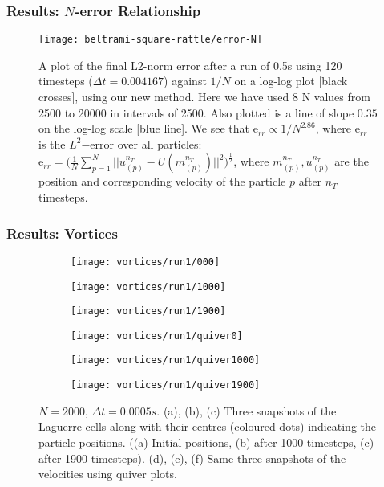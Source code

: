 \documentclass[10pt]{beamer}
\newcommand{\dt}{\Delta t}
\begin{document}
\frame
{
  \frametitle{Results: \(N\)-error Relationship}

\begin{figure}[H]
\texttt{[image: beltrami-square-rattle/error-N]}
\centering
\caption{A plot of the final L2-norm error after a run of 0.5s using 120 timesteps (\(\dt = 0.004167\)) against \(1/N\) on a log-log plot [black crosses], using our new method. Here we have used 8 N values from 2500 to 20000 in intervals of 2500. Also plotted is a line of slope \(0.35\) on the log-log scale [blue line]. 
We see that \(\text{e}_{rr} \propto 1/N^{2.86}\), where \(\text{e}_{rr}\) is the \(L^2\mathrm{-error}\) over all particles: \(\text{e}_{rr} = \Big( \frac{1}{N} \sum_{p = 1}^{N} || u^{n_T}_{(p)} - U(m^{n_T}_{(p)}) ||^2 \Big) ^\frac{1}{2}\), where \(m^{n_T}_{(p)}, u^{n_T}_{(p)}\) are the position and corresponding velocity of the particle \(p\) after \(n_T\) timesteps.}
\centering
\label{fig:error-N}
\end{figure}

}

\frame
{
  \frametitle{Results: Vortices}

\begin{figure}[H]
   \begin{subfigure}[t]{0.25\textwidth}
        \centering
        \texttt{[image: vortices/run1/000]}
        \caption{} \label{fig:vortices-000}
    \end{subfigure}
   \begin{subfigure}[t]{0.25\textwidth}
        \centering
	\texttt{[image: vortices/run1/1000]}
        \caption{} \label{fig:vortices-1000}
    \end{subfigure}
   \begin{subfigure}[t]{0.25\textwidth}
        \centering
	\texttt{[image: vortices/run1/1900]}
        \caption{} \label{fig:vortices-1900}
    \end{subfigure}
   \begin{subfigure}[t]{0.25\textwidth}
        \centering
        \texttt{[image: vortices/run1/quiver0]}
        \caption{} \label{fig:vortices-quiver0}
    \end{subfigure}
   \begin{subfigure}[t]{0.25\textwidth}
        \centering
        \texttt{[image: vortices/run1/quiver1000]}
        \caption{} \label{fig:vortices-quiver1000}
    \end{subfigure}
   \begin{subfigure}[t]{0.25\textwidth}
        \centering
        \texttt{[image: vortices/run1/quiver1900]}
        \caption{} \label{fig:vortices-quiver1900}
    \end{subfigure}
\centering
\caption{\(N = 2000\), \(\dt = 0.0005s\). (a), (b), (c) Three snapshots of the Laguerre cells along with their centres (coloured dots) indicating the particle positions. ((a) Initial positions, (b) after 1000 timesteps, (c) after 1900 timesteps). (d), (e), (f) Same three snapshots of the velocities using quiver plots.}
\centering
\label{fig:vortices}
\end{figure}

}
\end{document}
